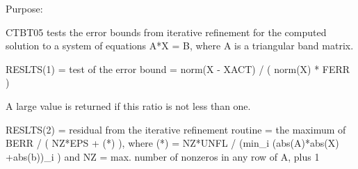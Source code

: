 \begin{DoxyParagraph}{Purpose\+: }
\begin{DoxyVerb} CTBT05 tests the error bounds from iterative refinement for the
 computed solution to a system of equations A*X = B, where A is a
 triangular band matrix.

 RESLTS(1) = test of the error bound
           = norm(X - XACT) / ( norm(X) * FERR )

 A large value is returned if this ratio is not less than one.

 RESLTS(2) = residual from the iterative refinement routine
           = the maximum of BERR / ( NZ*EPS + (*) ), where
             (*) = NZ*UNFL / (min_i (abs(A)*abs(X) +abs(b))_i )
             and NZ = max. number of nonzeros in any row of A, plus 1\end{DoxyVerb}
 
\end{DoxyParagraph}

